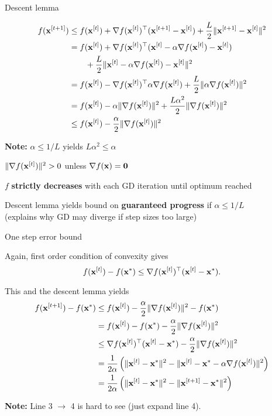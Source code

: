 \documentclass[11pt,compress,t,notes=noshow, xcolor=table]{beamer}
\begin{document}
\begin{framei}[fs=small]{Descent lemma}
\item[] \begin{align*}
f(\mathbf{x}^{[t+1]}) &\leq f(\mathbf{x}^{[t]}) + \nabla f(\mathbf{x}^{[t]})^\top(\mathbf{x}^{[t+1]} - \mathbf{x}^{[t]}) + \frac{L}{2} \|\mathbf{x}^{[t+1]} - \mathbf{x}^{[t]}\|^2 \\
&= f(\mathbf{x}^{[t]}) + \nabla f(\mathbf{x}^{[t]})^\top(\mathbf{x}^{[t]} - \alpha \nabla f(\mathbf{x}^{[t]}) - \mathbf{x}^{[t]}) \\
&\qquad + \frac{L}{2} \|\mathbf{x}^{[t]} - \alpha \nabla f(\mathbf{x}^{[t]}) - \mathbf{x}^{[t]}\|^2 \\
&= f(\mathbf{x}^{[t]}) - \nabla f(\mathbf{x}^{[t]})^\top \alpha  \nabla f(\mathbf{x}^{[t]}) + \frac{L}{2} \|\alpha \nabla f(\mathbf{x}^{[t]})\|^2 \\
&= f(\mathbf{x}^{[t]}) - \alpha \|\nabla f(\mathbf{x}^{[t]})\|^2 + \frac{L \alpha^2}{2} \|\nabla f(\mathbf{x}^{[t]})\|^2 \\
&\le f(\mathbf{x}^{[t]}) - \frac{\alpha}{2} \|\nabla f(\mathbf{x}^{[t]})\|^2
\end{align*}
\item\textbf{Note:} $\alpha \leq 1/L$ yields $L \alpha^2 \leq \alpha$
\begin{itemizeS}
\item $\|\nabla f(\mathbf{x}^{[t]})\|^2 > 0$ unless $\nabla f(\mathbf{x}) = \mathbf{0}$
\item $f$ \textbf{strictly decreases} with each GD iteration until optimum reached
\item Descent lemma yields bound on \textbf{guaranteed progress} if $\alpha \leq 1/L$ \\
(explains why GD may diverge if step sizes too large)
\end{itemizeS}
\end{framei}

\begin{framei}{One step error bound}
\item Again, first order condition of convexity gives 
$$f(\mathbf{x}^{[t]}) - f(\mathbf{x}^\ast) \leq  \nabla f(\mathbf{x}^{[t]})^\top (\mathbf{x}^{[t]} - \mathbf{x}^\ast).$$
\item This and the descent lemma yields
\begin{align*}
f(\mathbf{x}^{[t+1]}) - f(\mathbf{x}^\ast) &\leq f(\mathbf{x}^{[t]})  - \frac{\alpha}{2}\|\nabla f(\mathbf{x}^{[t]})\|^2  - f(\mathbf{x}^\ast) \\
&= f(\mathbf{x}^{[t]})  - f(\mathbf{x}^\ast)  - \frac{\alpha}{2}\|\nabla f(\mathbf{x}^{[t]})\|^2 \\
&\leq \nabla f(\mathbf{x}^{[t]})^\top (\mathbf{x}^{[t]}-\mathbf{x}^*) - \frac{\alpha}{2}\|\nabla f(\mathbf{x}^{[t]})\|^2 \\
&= \frac{1}{2 \alpha} \left( \|\mathbf{x}^{[t]}-\mathbf{x}^\ast\|^2 - \| \mathbf{x}^{[t]} - \mathbf{x}^\ast - \alpha \nabla f(\mathbf{x}^{[t]})\|^2 \right) \\
&= \frac{1}{2 \alpha} \left( \|\mathbf{x}^{[t]}-\mathbf{x}^\ast\|^2 - \| \mathbf{x}^{[t+1]} - \mathbf{x}^\ast \|^2 \right)
\end{align*}
\item\textbf{Note:} Line 3 $\to$ 4 is hard to see (just expand line 4).
\end{framei}
\end{document}
